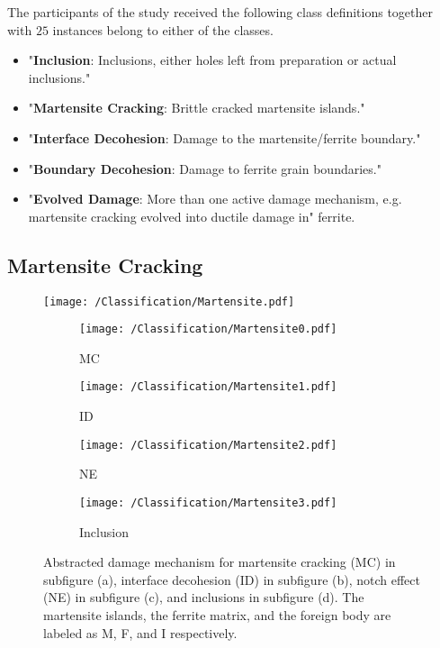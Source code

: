 The participants of the study received the following class definitions together with $25$ instances belong to either of the classes.\\
\begin{itemize}[label={}]
\item "\textbf{Inclusion}: Inclusions, either holes left from preparation or actual inclusions."
\item "\textbf{Martensite Cracking}: Brittle cracked martensite islands."
\item "\textbf{Interface Decohesion}: Damage to the martensite/ferrite boundary."
\item "\textbf{Boundary Decohesion}: Damage to ferrite grain boundaries."
\item "\textbf{Evolved Damage}: More than one active damage mechanism, e.g. martensite cracking evolved into ductile damage in" ferrite.
\end{itemize}

\subsection{Martensite Cracking}

\begin{figure}
\centering
\texttt{[image: /Classification/Martensite.pdf]}
\end{figure}

\begin{figure}[H]
\begin{subfigure}{.25\textwidth}
\centering
  \texttt{[image: /Classification/Martensite0.pdf]}
  \caption{MC}
  \label{fig:MC}
\end{subfigure}%
\begin{subfigure}{.25\textwidth}
\centering
  \texttt{[image: /Classification/Martensite1.pdf]}
  \caption{ID}
  \label{fig:Interface_scalebar}
\end{subfigure}%
\centering
\begin{subfigure}{.25\textwidth}
\centering
  \texttt{[image: /Classification/Martensite2.pdf]}
  \caption{NE}
  \label{fig:Notch_scalebar}
\end{subfigure}%
\begin{subfigure}{.25\textwidth}
\centering
  \texttt{[image: /Classification/Martensite3.pdf]}
  \caption{Inclusion}
  \label{fig:Inclusion_scalebar}
\end{subfigure}%
\caption{Abstracted damage mechanism for martensite cracking (MC) in subfigure (a), interface decohesion (ID) in subfigure (b), notch effect (NE) in subfigure (c),  and inclusions in subfigure (d). The martensite islands, the ferrite matrix, and the foreign body are labeled as M, F, and I respectively.}
\label{fig:classes}
\end{figure}

